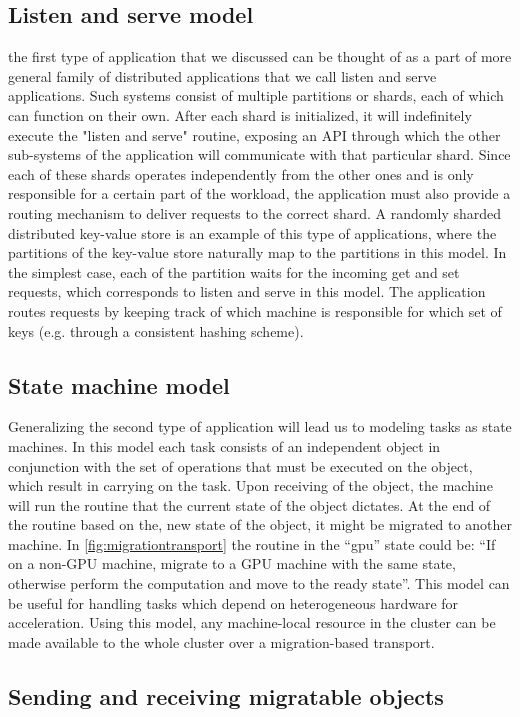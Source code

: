 \subsection{Listen and serve model}
the first type of application that we discussed can be thought of as a
part of more general family of distributed applications that we call
listen and serve applications.
Such systems consist of multiple partitions or shards, each
of which can function on their own. After each shard is initialized, it
will indefinitely execute the "listen and serve" routine,
exposing an API through which the other sub-systems of the application
will communicate with that particular shard. Since each of these shards
operates independently from the other ones and is only
responsible for a certain part of the workload, the application
must also provide a routing mechanism to
deliver requests to the correct shard. A randomly sharded distributed
key-value store is an example of this type of applications, where the
partitions of the key-value store naturally map to the partitions in this
model. In the simplest case, each of the partition waits for the incoming
get and set requests, which corresponds to listen and serve in this model.
The application routes requests by keeping track of which machine
is responsible for which set of keys (e.g. through a consistent hashing
scheme).

\subsection{State machine model}
Generalizing the second type of application will lead us to modeling
tasks as state machines. In this model each task consists of an
independent object in conjunction with the set of operations that must be
executed on the object, which result in carrying on the task. Upon
receiving of the object, the machine will run the routine that the current
state of the object dictates. At the end of the routine based on the, new
state of the object, it might be migrated to another machine. In
\autoref{fig:migrationtransport} the routine in the ``gpu'' state could be:
``If on a non-GPU machine, migrate to a GPU machine with the same state,
otherwise perform the computation and move to the ready state''. This
model can be useful for handling tasks which depend on heterogeneous
hardware for acceleration. Using this model, any machine-local
resource in the cluster can be made available to the whole cluster over
a migration-based transport.


\subsection{Sending and receiving migratable objects}

